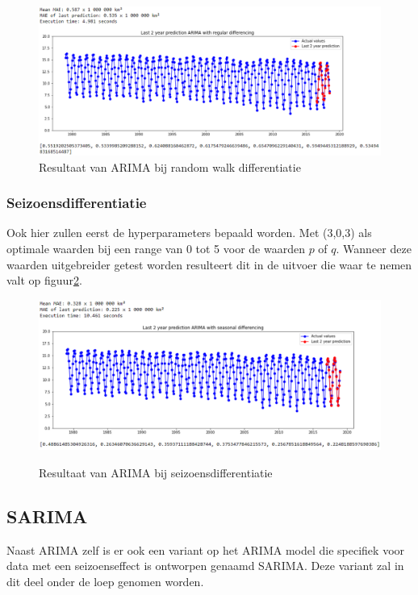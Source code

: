 \begin{figure}
    \centering
    \caption{Resultaat van ARIMA bij random walk differentiatie}
    \label{fig:uvsarimadiff}
    \includegraphics[width=1\linewidth]{uv_s_arima_diff}
\end{figure}


\subsubsection{Seizoensdifferentiatie}

Ook hier zullen eerst de hyperparameters bepaald worden. Met (3,0,3) als optimale waarden bij een range van 0 tot 5 voor de waarden $p$ of $q$. Wanneer deze waarden uitgebreider getest worden resulteert dit in de uitvoer die waar te nemen valt op figuur\ref{fig:uvsarimasdiff}.


\begin{figure}
    \centering
    \caption{Resultaat van ARIMA bij seizoensdifferentiatie}
    \includegraphics[width=1\linewidth]{uv_s_arima_sdiff}
    \label{fig:uvsarimasdiff}
\end{figure}

\subsection{SARIMA}

Naast ARIMA zelf is er ook een variant op het ARIMA model die specifiek voor data met een seizoenseffect is ontworpen genaamd SARIMA. Deze variant zal in dit deel onder de loep genomen worden.

